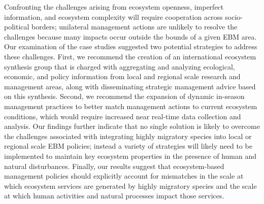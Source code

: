 Confronting the challenges arising from ecosystem openness, imperfect
information, and ecosystem complexity will require cooperation across
socio-political borders; unilateral management actions are unlikely to resolve
the challenges because many impacts occur outside the bounds of a given EBM
area. Our examination of the case studies suggested two potential strategies to
address these challenges. First, we recommend the creation of an international
ecosystem synthesis group that is charged with aggregating and analyzing
ecological, economic, and policy information from local and regional scale
research and management areas, along with disseminating strategic management
advice based on this synthesis. Second, we recommend the expansion of dynamic
in-season management practices to better match management actions to current
ecosystem conditions, which would require increased near real-time data
collection and analysis. Our findings further indicate that no single solution
is likely to overcome the challenges associated with integrating highly
migratory species into local or regional scale EBM policies; instead a
variety of strategies will likely need to be implemented to maintain key
ecosystem properties in the presence of human and natural disturbances. Finally,
our results suggest that ecosystem-based management policies should explicitly
account for mismatches in the scale at which ecosystem services are generated by
highly migratory species and the scale at which human activities and natural
processes impact those services.
